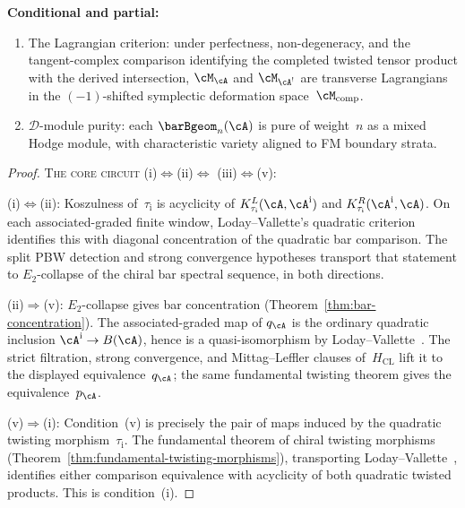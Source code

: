 \begin{theorem}
\smallskip
\noindent\textbf{Conditional and partial:}
\begin{enumerate}
\item[\textup{(xi)}] The Lagrangian criterion: under perfectness,
 non-degeneracy, and the tangent-complex comparison identifying the
 completed twisted tensor product with the derived intersection,
 $\cM_\cA$ and $\cM_{\cA^!}$ are transverse Lagrangians in the
 $(-1)$-shifted symplectic deformation space~$\cM_{\mathrm{comp}}$.
\item[\textup{(xii)}] $\mathcal{D}$-module purity: each
 $\barBgeom_n(\cA)$ is pure of weight~$n$ as a mixed Hodge module,
 with characteristic variety aligned to FM boundary strata.
\end{enumerate}
\end{theorem}

\begin{proof}
\textsc{The core circuit}
\textup{(i)}$\Leftrightarrow$\textup{(ii)}$\Leftrightarrow$%
\textup{(iii)}$\Leftrightarrow$\textup{(v)}:

\smallskip\noindent
\textup{(i)}$\Leftrightarrow$\textup{(ii)}:
Koszulness of~$\tau_{\mathrm i}$ is acyclicity of
$K^L_{\tau_{\mathrm i}}(\cA,\cA^{\mathrm i})$ and
$K^R_{\tau_{\mathrm i}}(\cA^{\mathrm i},\cA)$.  On each associated-graded
finite window, Loday--Vallette's quadratic criterion
\cite[Theorem~3.4.6]{LV12} identifies this with diagonal
concentration of the quadratic bar comparison.  The split PBW
detection and strong convergence hypotheses transport that statement
to $E_2$-collapse of the chiral bar spectral sequence, in both
directions.

\smallskip\noindent
\textup{(ii)}$\Rightarrow$\textup{(v)}:
$E_2$-collapse gives bar concentration
(Theorem~\ref{thm:bar-concentration}).  The associated-graded map of
$q_\cA$ is the ordinary quadratic inclusion
$\cA^{\mathrm i}\to B(\cA)$, hence is a quasi-isomorphism by
Loday--Vallette~\cite[Theorem~3.4.6]{LV12}.  The strict filtration,
strong convergence, and Mittag--Leffler clauses of~$H_{\mathrm{CL}}$
lift it to the displayed equivalence~$q_\cA$; the same fundamental
twisting theorem gives the equivalence~$p_\cA$.

\smallskip\noindent
\textup{(v)}$\Rightarrow$\textup{(i)}:
Condition~\textup{(v)} is precisely the pair of maps induced by the
quadratic twisting morphism~$\tau_{\mathrm i}$.  The fundamental theorem of
chiral twisting morphisms
\textup{(}Theorem~\ref{thm:fundamental-twisting-morphisms}\textup{)},
transporting Loday--Vallette~\cite[Theorem~2.3.2]{LV12}, identifies
either comparison equivalence with acyclicity of both quadratic
twisted products.  This is condition~\textup{(i)}.


\end{proof}
